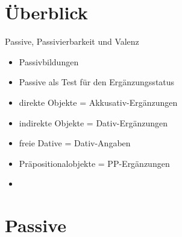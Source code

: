 
\section{Überblick}

\begin{frame}
  {Passive, Passivierbarkeit und Valenz}
  \begin{itemize}[<+->]
    \item Passivbildungen
    \item Passive als Test für den Ergänzungsstatus
      \Halbzeile
    \item direkte Objekte = Akkusativ-Ergänzungen
    \item indirekte Objekte = Dativ-Ergänzungen
    \item freie Dative = Dativ-Angaben
    \item Präpositionalobjekte = PP-Ergänzungen
      \Halbzeile
    \item \citet{Schaefer2018b}
  \end{itemize}
\end{frame}

\section{Passive}

